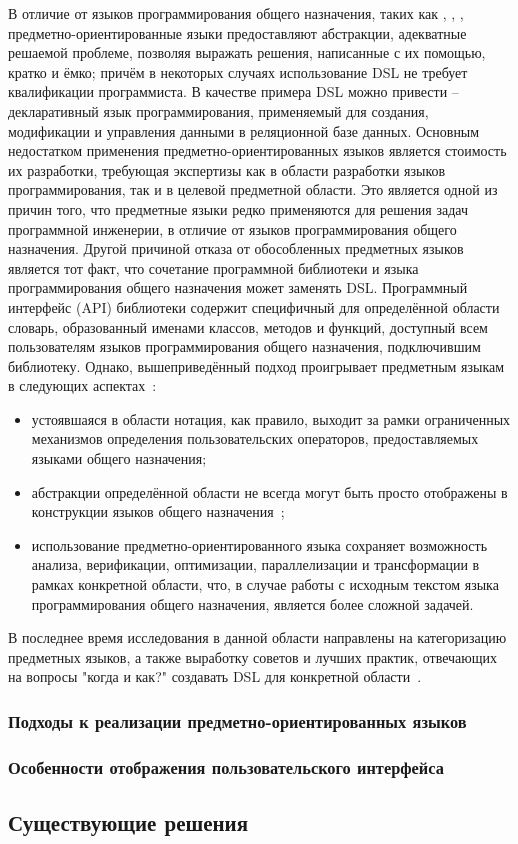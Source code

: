 В отличие от языков программирования общего назначения, таких как ,
, , предметно-ориентированные языки предоставляют
абстракции, адекватные решаемой проблеме, позволяя выражать решения,
написанные с их помощью, кратко и ёмко; причём в некоторых случаях
использование DSL не требует квалификации программиста.
В качестве примера DSL можно привести  --  декларативный язык
программирования, применяемый для создания, модификации и управления данными в
реляционной базе данных.
Основным недостатком применения предметно-ориентированных языков является
стоимость их разработки, требующая экспертизы как в области разработки языков
программирования, так и в целевой предметной области.
Это является одной из причин того, что предметные языки редко применяются
для решения задач программной инженерии, в отличие от языков программирования
общего назначения.
Другой причиной отказа от обособленных предметных языков является тот факт,
что сочетание программной библиотеки и языка программирования общего
назначения может заменять DSL.
Программный интерфейс (API) библиотеки содержит специфичный для определённой
области словарь, образованный именами классов, методов и функций, доступный
всем пользователям языков программирования общего назначения, подключившим
библиотеку.
Однако, вышеприведённый подход проигрывает предметным языкам в следующих
аспектах~\cite{when-and-how-develop-dsl}:
\begin{itemize}
	\item устоявшаяся в области нотация, как правило, выходит за рамки
	ограниченных механизмов определения пользовательских операторов,
	предоставляемых языками общего назначения;
	\item абстракции определённой области не всегда могут быть
	просто отображены в конструкции языков общего назначения~\cite{dsl-traversal-transform};
	\item использование предметно-ориентированного языка сохраняет
	возможность анализа, верификации, оптимизации, параллелизации и
	трансформации в рамках конкретной области, что, в случае работы с
	исходным текстом языка программирования общего назначения, является
	более сложной задачей.
\end{itemize}

В последнее время исследования в данной области направлены на категоризацию
предметных языков, а также выработку советов и лучших практик, отвечающих на
вопросы "когда и как?" создавать DSL для конкретной области~\cite{when-and-how-develop-dsl,study-on-preliminary-approaches-develop-dsl,spinellis-dsl-patterns}.

\subsubsection{Подходы к реализации предметно-ориентированных языков}

\subsubsection{Особенности отображения пользовательского интерфейса}


\subsection{Существующие решения}
